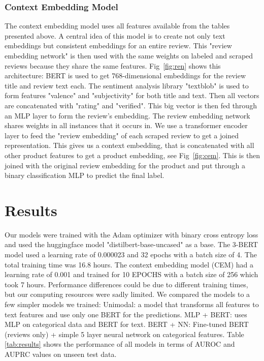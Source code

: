 \documentclass[utf8x]{ctexart}
\begin{document}
\subsubsection{Context Embedding Model}

The context embedding model uses all features available from the tables presented above. A central idea of this model is to create not only text embeddings but consistent embeddings for an entire review. This "review embedding network" is then used with the same weights on labeled and scraped reviews because they share the same features. Fig~\ref{fig:ren} shows this architecture: BERT is used to get 768-dimensional embeddings for the review title and review text each. The sentiment analysis library "textblob" is used to form features "valence" and "subjectivity" for both title and text. Then all vectors are concatenated with "rating" and "verified". This big vector is then fed through an MLP layer to form the review's embedding. The review embedding network shares weights in all instances that it occurs in. We use a transformer encoder layer to feed the "review embedding" of each scraped review to get a joined representation. This gives us a context embedding, that is concatenated with all other product features to get a product embedding, see Fig~\ref{fig:cem}. This is then joined with the original review embedding for the product and put through a binary classification MLP to predict the final label.

\section{Results}
\label{sec:results}

Our models were trained with the Adam optimizer with binary cross entropy loss and used the huggingface model "distilbert-base-uncased" as a base.
The 3-BERT model used a learning rate of 0.000023 and 32 epochs with a batch size of 4. The total training time was 16.8 hours.
The context embedding model (CEM) had a learning rate of 0.001 and trained for 10 EPOCHS with a batch size of 256 which took 7 hours. Performance differences could be due to different training times, but our computing resources were sadly limited. We compared the models to a few simpler models we trained: Unimodal: a model that transforms all features to text features and use only one BERT for the predictions. MLP + BERT:  uses MLP on categorical data and BERT for text. BERT + NN: Fine-tuned BERT (reviews only) + simple 5 layer neural network on categorical features.
Table \ref{tab:results} shows the performance of all models in terms of AUROC and AUPRC values on unseen test data.
\end{document}
